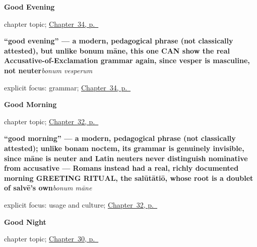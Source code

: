 \noindent\begin{minipage}[t]{\linewidth}
\raggedright
\textbf{Good Evening}\par
\footnotesize chapter topic; \hyperref[ch:la-good-evening]{Chapter~34, p.~\pageref*{ch:la-good-evening}}
\end{minipage}\par\smallskip

\noindent\begin{minipage}[t]{\linewidth}
\raggedright
\textbf{\textquotedblleft{}good evening\textquotedblright{} — a modern, pedagogical phrase (not classically attested), but unlike bonum māne, this one CAN show the real Accusative-of-Exclamation grammar again, since vesper is masculine, not neuter}\enspace\emph{bonum vesperum}\par
\footnotesize explicit focus: grammar; \hyperref[ch:la-good-evening]{Chapter~34, p.~\pageref*{ch:la-good-evening}}
\end{minipage}\par\smallskip

\noindent\begin{minipage}[t]{\linewidth}
\raggedright
\textbf{Good Morning}\par
\footnotesize chapter topic; \hyperref[ch:la-good-morning]{Chapter~32, p.~\pageref*{ch:la-good-morning}}
\end{minipage}\par\smallskip

\noindent\begin{minipage}[t]{\linewidth}
\raggedright
\textbf{\textquotedblleft{}good morning\textquotedblright{} — a modern, pedagogical phrase (not classically attested); unlike bonam noctem, its grammar is genuinely invisible, since māne is neuter and Latin neuters never distinguish nominative from accusative — Romans instead had a real, richly documented morning GREETING RITUAL, the salūtātiō, whose root is a doublet of salvē's own}\enspace\emph{bonum māne}\par
\footnotesize explicit focus: usage and culture; \hyperref[ch:la-good-morning]{Chapter~32, p.~\pageref*{ch:la-good-morning}}
\end{minipage}\par\smallskip

\noindent\begin{minipage}[t]{\linewidth}
\raggedright
\textbf{Good Night}\par
\footnotesize chapter topic; \hyperref[ch:la-good-night]{Chapter~30, p.~\pageref*{ch:la-good-night}}
\end{minipage}\par\smallskip

